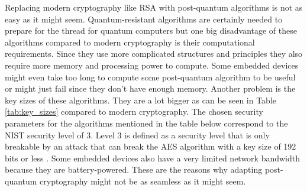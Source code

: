 Replacing modern cryptography like RSA with post-quantum algorithms is not as easy as it might seem. Quantum-resistant algorithms are certainly needed to prepare for the thread for quantum computers but one big disadvantage of these algorithms compared to modern cryptography is their computational requirements. Since they use more complicated structures and principles they also require more memory and processing power to compute. Some embedded devices might even take too long to compute some post-quantum algorithm to be useful or might just fail since they don't have enough memory. Another problem is the key sizes of these algorithms. They are a lot bigger as can be seen in Table \ref{tab:key_sizes} compared to modern cryptography. The chosen security parameters for the algorithms mentioned in the table below correspond to the NIST security level of 3. Level 3 is defined as a security level that is only breakable by an attack that can break the AES algorithm with a key size of 192 bits or less \cite{8lV5dQrQyshiCp3i}. Some embedded devices also have a very limited network bandwidth because they are battery-powered. These are the reasons why adapting post-quantum cryptography might not be as seamless as it might seem.

